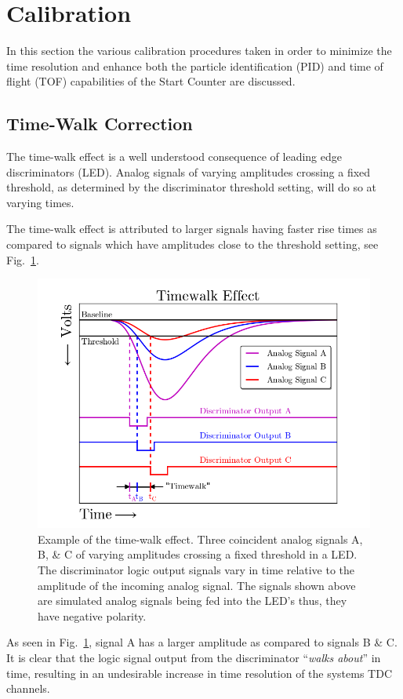 \section{Calibration} \label{sec:calib}

In this section the various calibration procedures taken in order to minimize the time resolution and enhance both the particle identification (PID) and time of flight (TOF) capabilities of the Start Counter are discussed.

\subsection{Time-Walk Correction} \label{sec:calib_tw}

The time-walk effect is a well understood consequence of leading edge discriminators (LED).  Analog signals of varying amplitudes crossing a fixed threshold, as determined by the discriminator threshold setting, will do so at varying times.

The time-walk effect is attributed to larger signals having faster rise times as compared to signals which have amplitudes close to the threshold setting, see Fig.~\ref{fig:time_walk_effect}.
\begin{figure}[!htb]
	\centering
	\includegraphics[width=1.0\columnwidth]{calibration/figs/time_walk_effect}
	\caption{Example of the time-walk effect. Three coincident analog signals A, B, \& C of varying amplitudes crossing a fixed threshold in a LED. The discriminator logic output signals vary in time relative to the amplitude of the incoming analog signal.  The signals shown above are simulated analog signals being fed into the LED's thus, they have negative polarity.}
	\label{fig:time_walk_effect}
\end{figure}
As seen in Fig.~\ref{fig:time_walk_effect}, signal A has a larger amplitude as compared to signals B \& C.  It is clear that the logic signal output from the discriminator ``\textit{walks about}'' in time, resulting in an undesirable increase in time resolution of the systems TDC channels.


